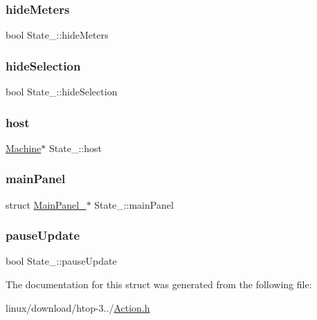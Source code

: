 \mbox{\label{structState___ae1a361b1c6850f2378b4aa851c7c7c3f}} 
\subsubsection{\texorpdfstring{hide\+Meters}{hideMeters}}
{\footnotesize\ttfamily bool State\+\_\+\+::hide\+Meters}

\mbox{\label{structState___abdbdd43797680994c3efbcec998b371a}} 
\subsubsection{\texorpdfstring{hide\+Selection}{hideSelection}}
{\footnotesize\ttfamily bool State\+\_\+\+::hide\+Selection}

\mbox{\label{structState___aee4f6aa93b6ebea62dd77104dd70e071}} 
\subsubsection{\texorpdfstring{host}{host}}
{\footnotesize\ttfamily \hyperlink{Machine_8h_aa3706f95e4706b9d02979efcabb1341d}{Machine}$\ast$ State\+\_\+\+::host}

\mbox{\label{structState___ac900533bf1f332c33e0b17e7112c78f7}} 
\subsubsection{\texorpdfstring{main\+Panel}{mainPanel}}
{\footnotesize\ttfamily struct \hyperlink{structMainPanel__}{Main\+Panel\+\_\+}$\ast$ State\+\_\+\+::main\+Panel}

\mbox{\label{structState___a7899d2f5312b465dfcee5ce310a1b6c9}} 
\subsubsection{\texorpdfstring{pause\+Update}{pauseUpdate}}
{\footnotesize\ttfamily bool State\+\_\+\+::pause\+Update}



The documentation for this struct was generated from the following file\+:\begin{DoxyCompactItemize}
\item 
linux/download/htop-\/3../\hyperlink{Action_8h}{Action.\+h}\end{DoxyCompactItemize}
